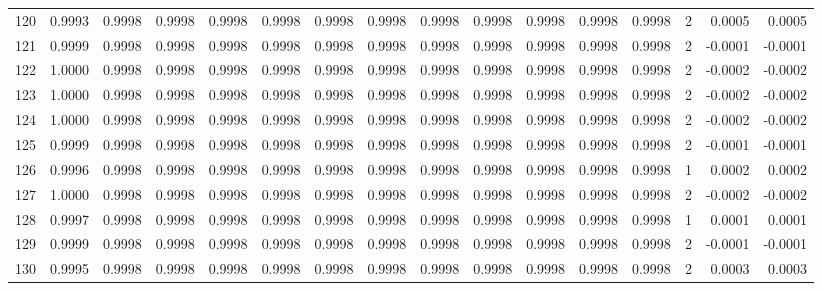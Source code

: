 \begin{tabular}{lrrrrrrrrrrrrrrr}
120 &      0.9993 &  0.9998 &  0.9998 &  0.9998 &  0.9998 &  0.9998 &  0.9998 &  0.9998 &  0.9998 &  0.9998 &   0.9998 &     0.9998 &      2 &                    0.0005 &                     0.0005 \\
121 &      0.9999 &  0.9998 &  0.9998 &  0.9998 &  0.9998 &  0.9998 &  0.9998 &  0.9998 &  0.9998 &  0.9998 &   0.9998 &     0.9998 &      2 &                   -0.0001 &                    -0.0001 \\
122 &      1.0000 &  0.9998 &  0.9998 &  0.9998 &  0.9998 &  0.9998 &  0.9998 &  0.9998 &  0.9998 &  0.9998 &   0.9998 &     0.9998 &      2 &                   -0.0002 &                    -0.0002 \\
123 &      1.0000 &  0.9998 &  0.9998 &  0.9998 &  0.9998 &  0.9998 &  0.9998 &  0.9998 &  0.9998 &  0.9998 &   0.9998 &     0.9998 &      2 &                   -0.0002 &                    -0.0002 \\
124 &      1.0000 &  0.9998 &  0.9998 &  0.9998 &  0.9998 &  0.9998 &  0.9998 &  0.9998 &  0.9998 &  0.9998 &   0.9998 &     0.9998 &      2 &                   -0.0002 &                    -0.0002 \\
125 &      0.9999 &  0.9998 &  0.9998 &  0.9998 &  0.9998 &  0.9998 &  0.9998 &  0.9998 &  0.9998 &  0.9998 &   0.9998 &     0.9998 &      2 &                   -0.0001 &                    -0.0001 \\
126 &      0.9996 &  0.9998 &  0.9998 &  0.9998 &  0.9998 &  0.9998 &  0.9998 &  0.9998 &  0.9998 &  0.9998 &   0.9998 &     0.9998 &      1 &                    0.0002 &                     0.0002 \\
127 &      1.0000 &  0.9998 &  0.9998 &  0.9998 &  0.9998 &  0.9998 &  0.9998 &  0.9998 &  0.9998 &  0.9998 &   0.9998 &     0.9998 &      2 &                   -0.0002 &                    -0.0002 \\
128 &      0.9997 &  0.9998 &  0.9998 &  0.9998 &  0.9998 &  0.9998 &  0.9998 &  0.9998 &  0.9998 &  0.9998 &   0.9998 &     0.9998 &      1 &                    0.0001 &                     0.0001 \\
129 &      0.9999 &  0.9998 &  0.9998 &  0.9998 &  0.9998 &  0.9998 &  0.9998 &  0.9998 &  0.9998 &  0.9998 &   0.9998 &     0.9998 &      2 &                   -0.0001 &                    -0.0001 \\
130 &      0.9995 &  0.9998 &  0.9998 &  0.9998 &  0.9998 &  0.9998 &  0.9998 &  0.9998 &  0.9998 &  0.9998 &   0.9998 &     0.9998 &      2 &                    0.0003 &                     0.0003 \\

\end{tabular}
